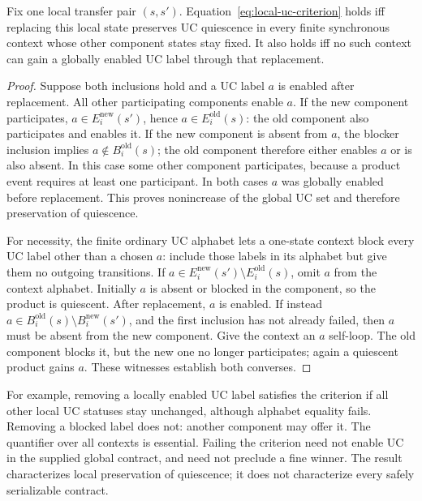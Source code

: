 \begin{proposition}\label{prop:contextual-uc}
Fix one local transfer pair $(s,s')$. Equation~\eqref{eq:local-uc-criterion} holds iff replacing this local state preserves UC quiescence in every finite synchronous context whose other component states stay fixed. It also holds iff no such context can gain a globally enabled UC label through that replacement.
\end{proposition}
\begin{proof}
Suppose both inclusions hold and a UC label $a$ is enabled after replacement. All other participating components enable $a$. If the new component participates, $a\in E_i^{\mathrm{new}}(s')$, hence $a\in E_i^{\mathrm{old}}(s)$: the old component also participates and enables it. If the new component is absent from $a$, the blocker inclusion implies $a\notin B_i^{\mathrm{old}}(s)$; the old component therefore either enables $a$ or is also absent. In this case some other component participates, because a product event requires at least one participant. In both cases $a$ was globally enabled before replacement. This proves nonincrease of the global UC set and therefore preservation of quiescence.

For necessity, the finite ordinary UC alphabet lets a one-state context block every UC label other than a chosen $a$: include those labels in its alphabet but give them no outgoing transitions. If $a\in E_i^{\mathrm{new}}(s')\setminus E_i^{\mathrm{old}}(s)$, omit $a$ from the context alphabet. Initially $a$ is absent or blocked in the component, so the product is quiescent. After replacement, $a$ is enabled. If instead $a\in B_i^{\mathrm{old}}(s)\setminus B_i^{\mathrm{new}}(s')$, and the first inclusion has not already failed, then $a$ must be absent from the new component. Give the context an $a$ self-loop. The old component blocks it, but the new one no longer participates; again a quiescent product gains $a$. These witnesses establish both converses.
\end{proof}
For example, removing a locally enabled UC label satisfies the criterion if all other local UC statuses stay unchanged, although alphabet equality fails. Removing a blocked label does not: another component may offer it. The quantifier over all contexts is essential. Failing the criterion need not enable UC in the supplied global contract, and need not preclude a fine winner. The result characterizes local preservation of quiescence; it does not characterize every safely serializable contract.

